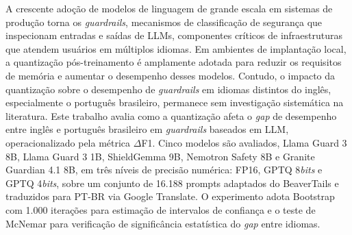 A crescente adoção de modelos de linguagem de grande escala em sistemas de produção torna os \textit{guardrails}, mecanismos de classificação de segurança que inspecionam entradas e saídas de LLMs, componentes críticos de infraestruturas que atendem usuários em múltiplos idiomas. Em ambientes de implantação local, a quantização pós-treinamento é amplamente adotada para reduzir os requisitos de memória e aumentar o desempenho desses modelos. Contudo, o impacto da quantização sobre o desempenho de \textit{guardrails} em idiomas distintos do inglês, especialmente o português brasileiro, permanece sem investigação sistemática na literatura. Este trabalho avalia como a quantização afeta o \textit{gap} de desempenho entre inglês e português brasileiro em \textit{guardrails} baseados em LLM, operacionalizado pela métrica $\Delta$F1. Cinco modelos são avaliados, Llama Guard 3 8B, Llama Guard 3 1B, ShieldGemma 9B, Nemotron Safety 8B e Granite Guardian 4.1 8B, em três níveis de precisão numérica: FP16, GPTQ 8\textit{bits} e GPTQ 4\textit{bits}, sobre um conjunto de 16.188 prompts adaptados do BeaverTails e traduzidos para PT-BR via Google Translate. O experimento adota Bootstrap com 1.000 iterações para estimação de intervalos de confiança e o teste de McNemar para verificação de significância estatística do \textit{gap} entre idiomas. 
